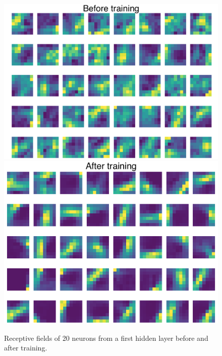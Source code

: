 \documentclass[12pt]{article}
\begin{document}
\begin{figure}[!htbp]
	\centering
	\includegraphics[width=12cm]{predictive_coding_stacked2_experiment3 before}
	\includegraphics[width=12cm]{predictive_coding_stacked2_experiment3 after}
	\caption{Receptive fields of 20 neurons from a first hidden layer before and after training.}
	\label{fig:experiment3}
\end{figure} 
\end{document}
